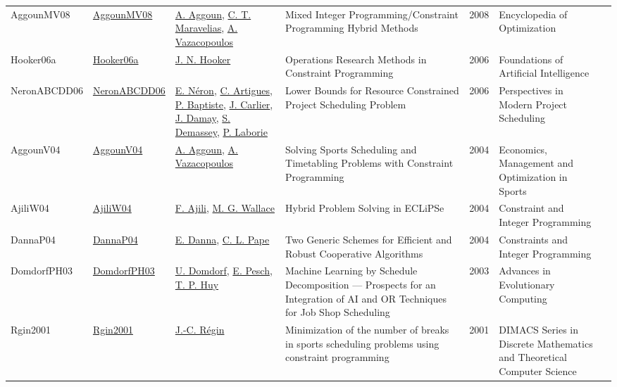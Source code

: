 {\begin{longtable}{p{2cm}p{2cm}p{5cm}p{10cm}rp{3cm}l}
AggounMV08 & \href{http://dx.doi.org/10.1007/978-0-387-74759-0_396}{AggounMV08} & \hyperref[auth:a725]{A. Aggoun}, \hyperref[auth:a381]{C. T. Maravelias}, \hyperref[auth:a907]{A. Vazacopoulos} & Mixed Integer Programming/Constraint Programming Hybrid Methods & 2008 & Encyclopedia of Optimization & \cite{AggounMV08}\\
Hooker06a & \href{http://dx.doi.org/10.1016/s1574-6526(06)80019-2}{Hooker06a} & \hyperref[auth:a160]{J. N. Hooker} & Operations Research Methods in Constraint Programming & 2006 & Foundations of Artificial Intelligence & \cite{Hooker06a}\\
NeronABCDD06 & \href{http://dx.doi.org/10.1007/978-0-387-33768-5_7}{NeronABCDD06} & \hyperref[auth:a899]{E. Néron}, \hyperref[auth:a6]{C. Artigues}, \hyperref[auth:a162]{P. Baptiste}, \hyperref[auth:a845]{J. Carlier}, \hyperref[auth:a900]{J. Damay}, \hyperref[auth:a243]{S. Demassey}, \hyperref[auth:a118]{P. Laborie} & Lower Bounds for Resource Constrained Project Scheduling Problem & 2006 & Perspectives in Modern Project Scheduling & \cite{NeronABCDD06}\\
AggounV04 & \href{http://dx.doi.org/10.1007/978-3-540-24734-0_15}{AggounV04} & \hyperref[auth:a725]{A. Aggoun}, \hyperref[auth:a907]{A. Vazacopoulos} & Solving Sports Scheduling and Timetabling Problems with Constraint Programming & 2004 & Economics, Management and Optimization in Sports & \cite{AggounV04}\\
AjiliW04 & \href{http://dx.doi.org/10.1007/978-1-4419-8917-8_6}{AjiliW04} & \hyperref[auth:a950]{F. Ajili}, \hyperref[auth:a117]{M. G. Wallace} & Hybrid Problem Solving in ECLiPSe & 2004 & Constraint and Integer Programming & \cite{AjiliW04}\\
DannaP04 & \href{http://dx.doi.org/10.1007/978-1-4419-8917-8_2}{DannaP04} & \hyperref[auth:a287]{E. Danna}, \hyperref[auth:a163]{C. L. Pape} & Two Generic Schemes for Efficient and Robust Cooperative Algorithms & 2004 & Constraints and Integer Programming & \cite{DannaP04}\\
DomdorfPH03 & \href{http://dx.doi.org/10.1007/978-3-642-18965-4_31}{DomdorfPH03} & \hyperref[auth:a960]{U. Domdorf}, \hyperref[auth:a438]{E. Pesch}, \hyperref[auth:a961]{T. P. Huy} & Machine Learning by Schedule Decomposition — Prospects for an Integration of AI and OR Techniques for Job Shop Scheduling & 2003 & Advances in Evolutionary Computing & \cite{DomdorfPH03}\\
Rgin2001 & \href{http://dx.doi.org/10.1090/dimacs/057/07}{Rgin2001} & \hyperref[auth:a1421]{J.-C. Régin} & Minimization of the number of breaks in sports scheduling problems using constraint programming & 2001 & DIMACS Series in Discrete Mathematics and Theoretical Computer Science & \cite{Rgin2001}\\

\end{longtable}}
